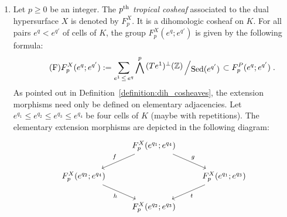 \documentclass[AHL,Unicode,longabstracts,published]{cedram}
\newcommand{\bigslant}[2]{{\raisebox{.2em}{$#1$}\left/\raisebox{-.2em}{$#2$}\right.}}
\newcommand{\Z}{\mathbb{Z}}
\DeclareMathOperator{\Sed}{Sed}
\begin{document}
\begin{defi}
\begin{enumerate}
\begin{figure}[h!]
\caption{A cube and the groups associated by $F_2^{P}$ to some of its faces.}
\end{figure}
\item Let $p\geq 0$ be an integer. The $p^{\rm th}$ \emph{tropical cosheaf} associated to the dual hypersurface $X$ is denoted by $F_p^{X}$. It is a dihomologic cosheaf on $K$. For all pairs $e^q<e^{q'}$ of cells of $K$, the group $F_p^{X}(e^q;e^{q'})$ is given by the following formula:
\begin{equation}\label{eq:F1}
\tag{F}
F_p^{X}(e^q;e^{q'}):= \sum_{e^1\,\leq\,e^q} \bigwedge^p \bigslant{(Te^1)^\perp(\Z)}{\Sed(e^{q'})}\subset F_p^P(e^q;e^{q'})\;.
\end{equation}
As pointed out in Definition~\ref{definition:dih_cosheaves}, the extension morphisms need only be defined on elementary adjacencies. Let $e^{q_1} \leq e^{q_2} \leq e^{q_3} \leq e^{q_4}$ be four cells of $K$ (maybe with repetitions). The elementary extension morphisms are depicted in the following diagram:
\begin{equation*}
\begin{tikzcd}
& F^{X}_p(e^{q_1};e^{q_4}) \ar[dr,"g" above right] \ar[dl,"f" above left] & \\%
F^{X}_p(e^{q_2};e^{q_4}) \ar[dr, "h" below left] & & F^{X}_p(e^{q_1};e^{q_3}) \ar[dl, "t" below right] \\%
& F^{X}_p(e^{q_2};e^{q_3}) &
\end{tikzcd}
\end{equation*}

\end{enumerate}
\end{defi}
\end{document}
